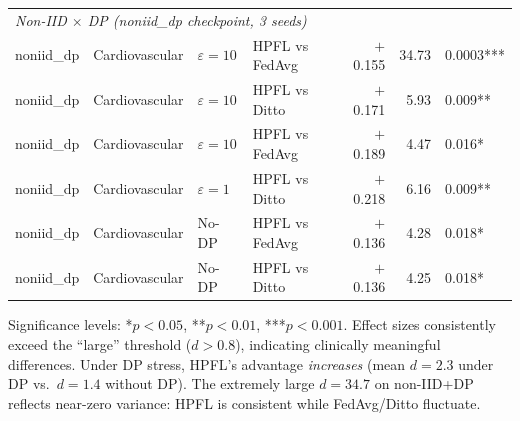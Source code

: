 \documentclass[conference]{IEEEtran}
\begin{document}
\begin{table}[htbp]
\begin{tabular}{llllrrl}
\midrule
\multicolumn{7}{l}{\textit{Non-IID $\times$ DP (noniid\_dp checkpoint, 3 seeds)}} \\
noniid\_dp & Cardiovascular & $\varepsilon{=}10$ & HPFL vs FedAvg & $+$0.155 & 34.73 & 0.0003*** \\
noniid\_dp & Cardiovascular & $\varepsilon{=}10$ & HPFL vs Ditto & $+$0.171 & 5.93 & 0.009** \\
noniid\_dp & Cardiovascular & $\varepsilon{=}10$ & HPFL vs FedAvg & $+$0.189 & 4.47 & 0.016* \\
noniid\_dp & Cardiovascular & $\varepsilon{=}1$ & HPFL vs Ditto & $+$0.218 & 6.16 & 0.009** \\
noniid\_dp & Cardiovascular & No-DP & HPFL vs FedAvg & $+$0.136 & 4.28 & 0.018* \\
noniid\_dp & Cardiovascular & No-DP & HPFL vs Ditto & $+$0.136 & 4.25 & 0.018* \\
\bottomrule
\end{tabular}

\vspace{1mm}
\footnotesize{Significance levels: *$p{<}0.05$, **$p{<}0.01$, ***$p{<}0.001$. Effect sizes consistently exceed the ``large'' threshold ($d{>}0.8$), indicating clinically meaningful differences. Under DP stress, HPFL's advantage \textit{increases} (mean $d{=}2.3$ under DP vs.\ $d{=}1.4$ without DP). The extremely large $d{=}34.7$ on non-IID+DP reflects near-zero variance: HPFL is consistent while FedAvg/Ditto fluctuate.}
\end{table}

\end{document}

